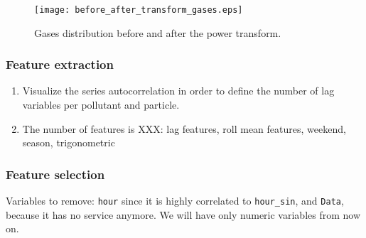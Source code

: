 \begin{figure*}
    \centering
    \texttt{[image: before\_after\_transform\_gases.eps]}
    \caption{Gases distribution before and after the power transform.}
    \label{fig:before-after-transform}
\end{figure*}
 
\subsubsection{Feature extraction}

\begin{enumerate}
    \item Visualize the series autocorrelation in order to define the number
    of lag variables per pollutant and particle.
    \item The number of features is XXX: lag features, roll mean features,
    weekend, season, trigonometric  
\end{enumerate}

\subsubsection{Feature selection}

Variables to remove: {\tt hour} since it is highly correlated to {\tt hour\_sin}, and {\tt Data}, because it has no service anymore. We will have
only numeric variables from now on. 



